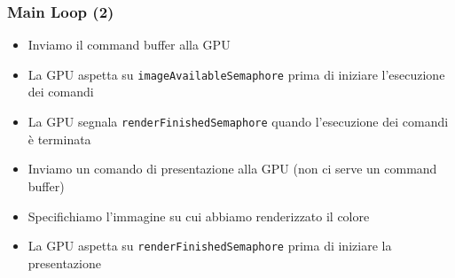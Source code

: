\begin{frame}
\frametitle{Main Loop (2)}

\begin{itemize}
\item Inviamo il command buffer alla GPU
\item La GPU aspetta su \texttt{imageAvailableSemaphore} prima di iniziare l'esecuzione dei comandi
\item La GPU segnala \texttt{renderFinishedSemaphore} quando l'esecuzione dei comandi è terminata
\item Inviamo un comando di presentazione alla GPU (non ci serve un command buffer)
\item Specifichiamo l'immagine su cui abbiamo renderizzato il colore
\item La GPU aspetta su \texttt{renderFinishedSemaphore} prima di iniziare la presentazione
\end{itemize}

\end{frame}
